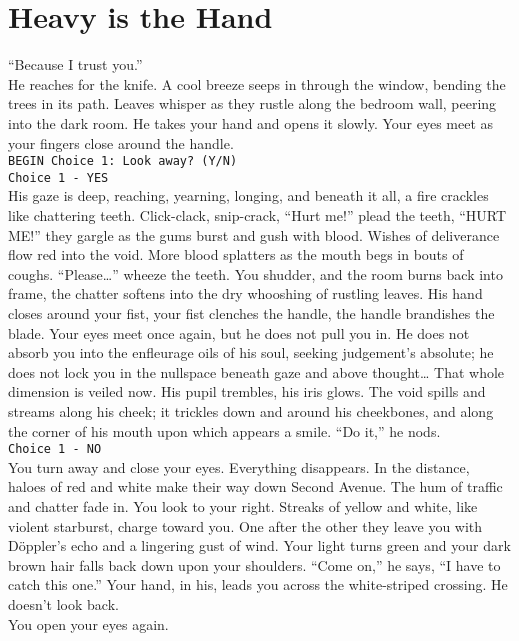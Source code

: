 \documentclass{antiquebook}
\begin{document}
    \frontmatter
    \titleP

    \mainmatter
    \pagestyle{fancy}

    \chapter{Heavy is the Hand}

    \indent “Because I trust you.” \\

\indent He reaches for the knife. A cool breeze seeps in through the window, bending the trees in its path. 
Leaves whisper as they rustle along the bedroom wall, peering into the dark room. He takes your hand and opens it slowly. 
Your eyes meet as your fingers close around the handle. \\

\texttt{BEGIN Choice 1: Look away? (Y/N)} \\ 

\texttt{Choice 1 - YES} \\
\indent His gaze is deep, reaching, yearning, longing, and beneath it all, a fire crackles like chattering teeth. 
Click-clack, snip-crack, “Hurt me!” plead the teeth, “HURT ME!” they gargle as the gums burst and gush with blood. 
Wishes of deliverance flow red into the void. More blood splatters as the mouth begs in bouts of coughs. 
“Please\dots ” wheeze the teeth. You shudder, and the room burns back into frame, the chatter softens into the dry whooshing of rustling leaves. 
His hand closes around your fist, your fist clenches the handle, the handle brandishes the blade. 
Your eyes meet once again, but he does not pull you in. He does not absorb you into the enfleurage oils of his soul, 
seeking judgement's absolute; he does not lock you in the nullspace beneath gaze and above thought\dots 
That whole dimension is veiled now. His pupil trembles, his iris glows. The void spills and streams along his cheek; 
it trickles down and around his cheekbones, and along the corner of his mouth upon which appears a smile. “Do it,” he nods. \\


\texttt{Choice 1 - NO} \\
\indent You turn away and close your eyes. Everything disappears. In the distance, haloes of red and white make their way down Second Avenue. 
The hum of traffic and chatter fade in. You look to your right. Streaks of yellow and white, like violent starburst, charge toward you. 
One after the other they leave you with Döppler's echo and a lingering gust of wind. 
Your light turns green and your dark brown hair falls back down upon your shoulders. “Come on,” he says, “I have to catch this one.” 
Your hand, in his, leads you across the white-striped crossing. He doesn't look back. \\
You open your eyes again. \\
\end{document}
